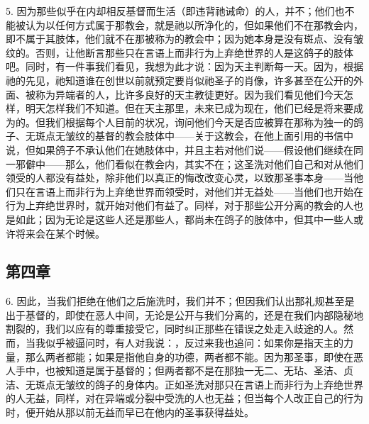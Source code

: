 5. 因为那些似乎在内却相反基督而生活（即违背祂诫命）的人，并不；他们也不能被认为以任何方式属于那教会，就是祂以所净化的，但如果他们不在那教会内，即不属于其肢体，他们就不在那被称为的教会中；因为她本身是没有斑点、没有皱纹的。否则，让他断言那些只在言语上而非行为上弃绝世界的人是这鸽子的肢体吧。同时，有一件事我们看见，我想为此才说：因为天主判断每一天。因为，根据祂的先见，祂知道谁在创世以前就预定要肖似祂圣子的肖像，许多甚至在公开的外面、被称为异端者的人，比许多良好的天主教徒更好。因为我们看见他们今天怎样，明天怎样我们不知道。但在天主那里，未来已成为现在，他们已经是将来要成为的。但我们根据每个人目前的状况，询问他们今天是否应被算在那称为独一的鸽子、无斑点无皱纹的基督的教会肢体中——关于这教会，在他上面引用的书信中说，但如果鸽子不承认他们在她肢体中，并且主若对他们说——假设他们继续在同一邪僻中——那么，他们看似在教会内，其实不在；这圣洗对他们自己和对从他们领受的人都没有益处，除非他们以真正的悔改改变心灵，以致那圣事本身——当他们只在言语上而非行为上弃绝世界而领受时，对他们并无益处——当他们也开始在行为上弃绝世界时，就开始对他们有益了。同样，对于那些公开分离的教会的人也是如此；因为无论是这些人还是那些人，都尚未在鸽子的肢体中，但其中一些人或许将来会在某个时候。\par


\subsection{第四章}

6. 因此，当我们拒绝在他们之后施洗时，我们并不；但因我们认出那礼规甚至是出于基督的，即使在恶人中间，无论是公开与我们分离的，还是在我们内部隐秘地割裂的，我们以应有的尊重接受它，同时纠正那些在错误之处走入歧途的人。然而，当我似乎被逼问时，有人对我说：，反过来我也追问：如果你是指天主的力量，那么两者都能；如果是指他自身的功德，两者都不能。因为那圣事，即使在恶人手中，也被知道是属于基督的；但两者都不是在那独一无二、无玷、圣洁、贞洁、无斑点无皱纹的鸽子的身体内。正如圣洗对那只在言语上而非行为上弃绝世界的人无益，同样，对在异端或分裂中受洗的人也无益；但当每个人改正自己的行为时，便开始从那以前无益而早已在他内的圣事获得益处。\par

